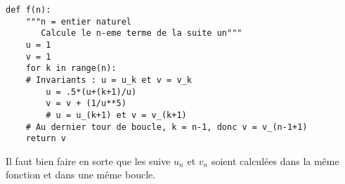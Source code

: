 \exer{}
\setcounter{numques}{0}

\question{}

\begin{lstlisting}
def f(n):
    """n = entier naturel
       Calcule le n-eme terme de la suite un"""
    u = 1
    v = 1
    for k in range(n):
	# Invariants : u = u_k et v = v_k
        u = .5*(u+(k+1)/u)
        v = v + (1/u**5)
        # u = u_(k+1) et v = v_(k+1)
    # Au dernier tour de boucle, k = n-1, donc v = v_(n-1+1)
    return v
\end{lstlisting}

\question{}

Il faut bien faire en sorte que les suive $u_n$ et $v_n$ soient calculées dans la même fonction et dans une même boucle.